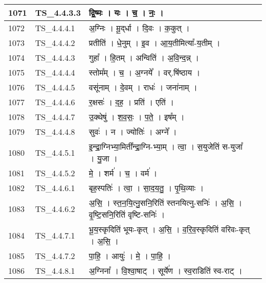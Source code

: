 \documentclass[17pt]{extarticle}
\begin{document}
\begin{longtable}{||p{0.4in}||p{0.9in}||p{4.0in}||p{0.9in}||}
        \hline
            1071 & TS\_4.4.3.3 & द्वि॒ष्मः   ।   यः   ।   च॒   ।   नः॒   ।    &      \\
        \hline
            1072 & TS\_4.4.4.1 & अ॒ग्निः   ।   मू॒द्‌र्धा   ।   दि॒वः   ।   क॒कुत्   ।    &      \\
        \hline
            1073 & TS\_4.4.4.2 & प्रतीति॑   ।   धे॒नुम्   ।   इ॒व   ।   आ॒य॒तीमित्या᳚{-}य॒तीम्   ।    &      \\
        \hline
            1074 & TS\_4.4.4.3 & गुहा᳚   ।   हि॒तम्   ।   अन्विति॑   ।   अ॒वि॒न्द॒न्न्   ।    &      \\
        \hline
            1075 & TS\_4.4.4.4 & स्तोम᳚म्   ।   च॒   ।   अ॒ग्नये᳚   ।   वर्.षि॑ष्ठाय   ।    &      \\
        \hline
            1076 & TS\_4.4.4.5 & वसू॑नाम्   ।   दे॒वम्   ।   राधः॑   ।   जना॑नाम्   ।    &      \\
        \hline
            1077 & TS\_4.4.4.6 & र॒क्षसः॑   ।   द॒ह॒   ।   प्रति॑   ।   एति॑   ।    &      \\
        \hline
            1078 & TS\_4.4.4.7 & उ॒क्थेषु॑   ।   श॒व॒सः॒   ।   प॒ते॒   ।   इष᳚म्   ।    &      \\
        \hline
            1079 & TS\_4.4.4.8 & सुवः॑   ।   न   ।   ज्योतिः॑   ।   अग्ने᳚   ।    &      \\
        \hline
            1080 & TS\_4.4.5.1 & इ॒न्द्रा॒ग्निभ्या॒मिती᳚न्द्रा॒ग्नि{-}भ्या॒म्   ।   त्वा॒   ।   स॒युजेति॑ स{-}युजा᳚   ।   यु॒जा   ।    &      \\
        \hline
            1081 & TS\_4.4.5.2 & मे॒   ।   शर्म॑   ।   च॒   ।   वर्म॑   ।    &      \\
        \hline
            1082 & TS\_4.4.6.1 & बृह॒स्पतिः॑   ।   त्वा॒   ।   सा॒द॒य॒तु॒   ।   पृ॒थि॒व्याः   ।    &      \\
        \hline
            1083 & TS\_4.4.6.2 & अ॒सि॒   ।   स्त॒न॒यि॒त्नु॒सनि॒रिति॑ स्तनयित्नु{-}सनिः॑   ।   अ॒सि॒   ।   वृ॒ष्टि॒सनि॒रिति॑ वृष्टि{-}सनिः॑   ।    &      \\
        \hline
            1084 & TS\_4.4.7.1 & भू॒य॒स्कृदिति॑ भूयः{-}कृत्   ।   अ॒सि॒   ।   व॒रि॒व॒स्कृदिति॑ वरिवः{-}कृत्   ।   अ॒सि॒   ।    &      \\
        \hline
            1085 & TS\_4.4.7.2 & पा॒हि॒   ।   आयुः॑   ।   मे॒   ।   पा॒हि॒   ।    &      \\
        \hline
            1086 & TS\_4.4.8.1 & अ॒ग्निना᳚   ।   वि॒श्वा॒षाट्   ।   सूर्ये॑ण   ।   स्व॒राडिति॑ स्व{-}राट्   ।    &      \\

\end{longtable}
\end{document}
